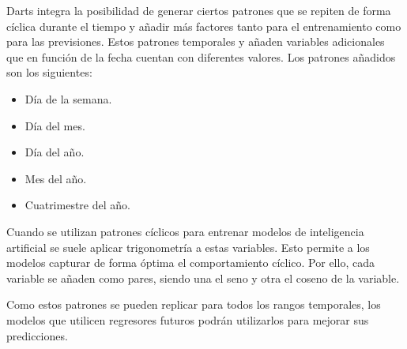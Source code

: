 Darts integra la posibilidad de generar ciertos patrones que se repiten de forma cíclica durante el tiempo y añadir más factores tanto para el entrenamiento como para las previsiones. Estos patrones temporales y añaden variables adicionales que en función de la fecha cuentan con diferentes valores. Los patrones añadidos son los siguientes:

\begin{itemize}
	\item Día de la semana.
	\item Día del mes.
	\item Día del año.
	\item Mes del año.
	\item Cuatrimestre del año. 
\end{itemize}

Cuando se utilizan patrones cíclicos para entrenar modelos de inteligencia artificial se suele aplicar trigonometría \cite{sincos} a estas variables. Esto permite a los modelos capturar de forma óptima el comportamiento cíclico. Por ello, cada variable se añaden como pares, siendo una el seno y otra el coseno de la variable.

Como estos patrones se pueden replicar para todos los rangos temporales, los modelos que utilicen regresores futuros podrán utilizarlos para mejorar sus predicciones.